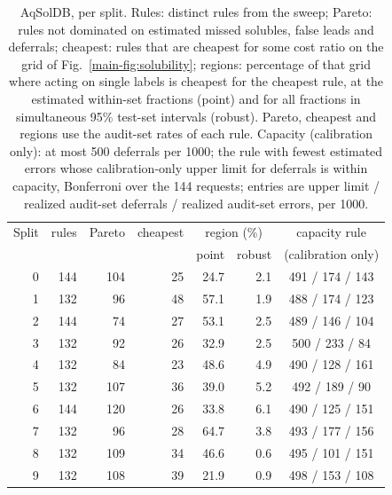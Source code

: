 \begin{table}[ht]
\centering
\caption{AqSolDB, per split. Rules: distinct rules from the sweep; Pareto: rules not dominated on estimated missed solubles, false leads and deferrals; cheapest: rules that are cheapest for some cost ratio on the grid of Fig.~\ref{main-fig:solubility}; regions: percentage of that grid where acting on single labels is cheapest for the cheapest rule, at the estimated within-set fractions (point) and for all fractions in simultaneous 95\% test-set intervals (robust). Pareto, cheapest and regions use the audit-set rates of each rule. Capacity (calibration only): at most 500 deferrals per 1000; the rule with fewest estimated errors whose calibration-only upper limit for deferrals is within capacity, Bonferroni over the 144 requests; entries are upper limit / realized audit-set deferrals / realized audit-set errors, per 1000.}
\label{tab:aqsolsplits}
\small
\begin{tabular}{rrrrrrc}
\toprule
Split & rules & Pareto & cheapest & \multicolumn{2}{c}{region (\%)} & capacity rule \\
 & & & & point & robust & (calibration only) \\
\midrule
0 & 144 & 104 & 25 & 24.7 & 2.1 & 491 / 174 / 143 \\
1 & 132 & 96 & 48 & 57.1 & 1.9 & 488 / 174 / 123 \\
2 & 144 & 74 & 27 & 53.1 & 2.5 & 489 / 146 / 104 \\
3 & 132 & 92 & 26 & 32.9 & 2.5 & 500 / 233 / 84 \\
4 & 132 & 84 & 23 & 48.6 & 4.9 & 490 / 128 / 161 \\
5 & 132 & 107 & 36 & 39.0 & 5.2 & 492 / 189 / 90 \\
6 & 144 & 120 & 26 & 33.8 & 6.1 & 490 / 125 / 151 \\
7 & 132 & 96 & 28 & 64.7 & 3.8 & 493 / 177 / 156 \\
8 & 132 & 109 & 34 & 46.6 & 0.6 & 495 / 101 / 151 \\
9 & 132 & 108 & 39 & 21.9 & 0.9 & 498 / 153 / 108 \\
\bottomrule
\end{tabular}
\end{table}
